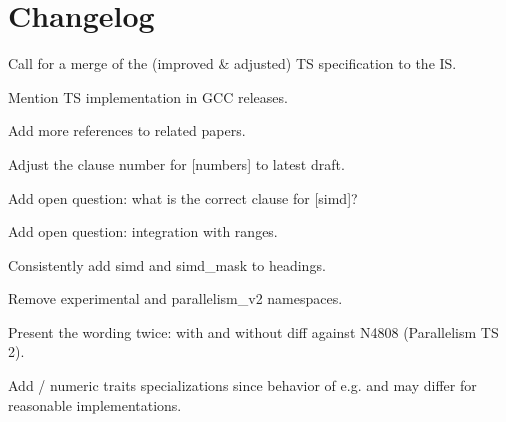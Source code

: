 \section{Changelog}
\begin{revision}
\item Call for a merge of the (improved \& adjusted) TS specification to the IS.
\item Mention TS implementation in GCC releases.
\item Add more references to related papers.
\item Adjust the clause number for [numbers] to latest draft.
\item Add open question: what is the correct clause for [simd]?
\item Add open question: integration with ranges.
\item Consistently add simd and simd_mask to headings.
\item Remove experimental and parallelism_v2 namespaces.
\item Present the wording twice: with and without diff against N4808 (Parallelism TS 2).

  \todo Add  / numeric traits specializations since behavior of e.g.  and  may differ for reasonable implementations.
\end{revision}
